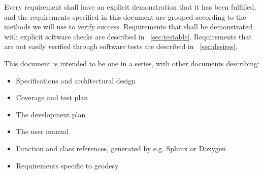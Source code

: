 
Every requirement shall have an explicit demonstration that it has been 
fulfilled, and the requirements specified in this document are grouped according
to the methods we will use to verify success. 
Requirements that shall be demonstrated with explicit software checks are 
described in \Sec~\ref{sec:testable}.
Requirements that are not easily verified through software tests are described
in \Sec~\ref{sec:desires}.


This document is intended to be one in a series, with other documents
describing:
\begin{itemize}
\item Specifications and architectural design
\item Coverage and test plan
\item The development plan
\item The user manual
\item Function and class references, generated by e.g. Sphinx or Doxygen
\item Requirements specific to geodesy
\end{itemize}









%
%
